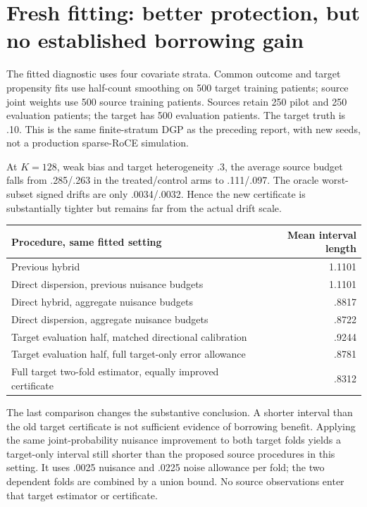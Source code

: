 \documentclass[11pt]{article}
\begin{document}
\section{Fresh fitting: better protection, but no established borrowing gain}

The fitted diagnostic uses four covariate strata. Common outcome and target
propensity fits use half-count smoothing on 500 target training patients;
source joint weights use 500 source training patients. Sources retain 250
pilot and 250 evaluation patients; the target has 500 evaluation patients.
The target truth is .10. This is the same finite-stratum DGP as the preceding
report, with new seeds, not a production sparse-RoCE simulation.

At $K=128$, weak bias and target heterogeneity .3, the average source budget
falls from .285/.263 in the treated/control arms to .111/.097. The oracle
worst-subset signed drifts are only .0034/.0032. Hence the new certificate
is substantially tighter but remains far from the actual drift scale.

\begin{center}\small
\begin{tabular}{lr}\toprule
Procedure, same fitted setting & Mean interval length\\\midrule
Previous hybrid & 1.1101\\
Direct dispersion, previous nuisance budgets & 1.1101\\
Direct hybrid, aggregate nuisance budgets & .8817\\
Direct dispersion, aggregate nuisance budgets & .8722\\
Target evaluation half, matched directional calibration & .9244\\
Target evaluation half, full target-only error allowance & .8781\\
Full target two-fold estimator, equally improved certificate & .8312\\\bottomrule
\end{tabular}
\end{center}

The last comparison changes the substantive conclusion. A shorter interval
than the old target certificate is not sufficient evidence of borrowing
benefit. Applying the same joint-probability nuisance improvement to both
target folds yields a target-only interval still shorter than the proposed
source procedures in this setting. It uses .0025 nuisance and .0225 noise
allowance per fold; the two dependent folds are combined by a union bound.
No source observations enter that target estimator or certificate.
\end{document}
